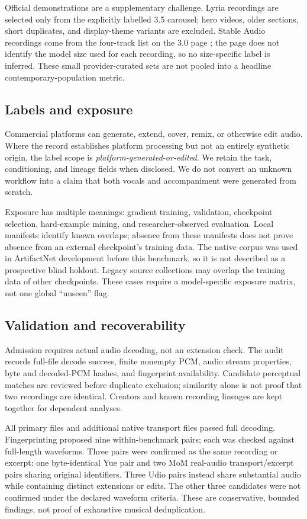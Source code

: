 \documentclass[10pt,a4paper]{article}
\begin{document}
Official demonstrations are a supplementary challenge. Lyria recordings are
selected only from the explicitly labelled 3.5 carousel; hero videos, older
sections, short duplicates, and display-theme variants are excluded. Stable
Audio recordings come from the four-track list on the 3.0 page
\citep{stableaudiodemo}; the page does not identify the model size used for each
recording, so no size-specific label is inferred. These small provider-curated
sets are not pooled into a headline contemporary-population metric.

\subsection{Labels and exposure}
Commercial platforms can generate, extend, cover, remix, or otherwise edit
audio. Where the record establishes platform processing but not an entirely
synthetic origin, the label scope is \emph{platform-generated-or-edited}. We
retain the task, conditioning, and lineage fields when disclosed. We do not
convert an unknown workflow into a claim that both vocals and accompaniment
were generated from scratch.

Exposure has multiple meanings: gradient training, validation, checkpoint
selection, hard-example mining, and researcher-observed evaluation. Local
manifests identify known overlaps; absence from these manifests does not prove
absence from an external checkpoint's training data. The native corpus was
used in ArtifactNet development before this benchmark, so it is not described
as a prospective blind holdout. Legacy source collections may overlap the
training data of other checkpoints. These cases require a model-specific
exposure matrix, not one global ``unseen'' flag.

\subsection{Validation and recoverability}
Admission requires actual audio decoding, not an extension check. The audit
records full-file decode success, finite nonempty PCM, audio stream properties,
byte and decoded-PCM hashes, and fingerprint availability. Candidate perceptual
matches are reviewed before duplicate exclusion; similarity alone is not proof
that two recordings are identical. Creators and known recording lineages are
kept together for dependent analyses.

All \BenchEntries{} primary files and \NativePairs{} additional native transport
files passed full decoding. Fingerprinting proposed nine within-benchmark pairs;
each was checked against full-length waveforms. Three pairs were confirmed as
the same recording or excerpt: one byte-identical Yue pair and two MoM real-audio
transport/excerpt pairs sharing original identifiers. Three Udio pairs instead
share substantial audio while containing distinct extensions or edits. The other
three candidates were not confirmed under the declared waveform criteria.
These are conservative, bounded findings, not proof of exhaustive musical deduplication.
\end{document}
